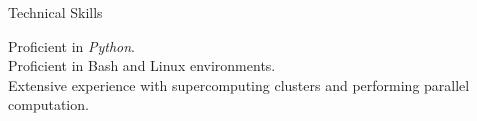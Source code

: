 \documentclass{resume} %
\begin{document}

\begin{rSection}{Technical Skills}

Proficient in \textit{Python}.\\
Proficient in Bash and Linux environments.\\
Extensive experience with supercomputing clusters and performing parallel computation.

\end{rSection}
\end{document}
